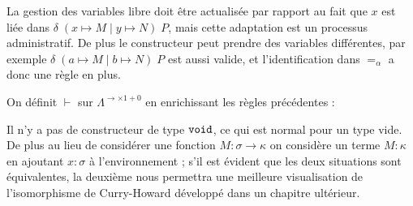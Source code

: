 \begin{rmk}
    La gestion des variables libre doit être actualisée par rapport au fait que $x$ est liée dans $\delta\;(x\mapsto M\mid y\mapsto N)\;P$, mais cette adaptation est un processus administratif. De plus le constructeur peut prendre des variables différentes, par exemple $\delta\;(a\mapsto M\mid b\mapsto N)\;P$ est aussi valide, et l'identification dans $=_\alpha$ a donc une règle en plus.
\end{rmk}

\begin{defi}
    On définit $\vdash$ sur $\Lambda^{\to\times 1+0}$ en enrichissant les règles précédentes :
    \begin{center}
        \begin{prooftree}
        \end{prooftree}
        \qquad
        \begin{prooftree}
        \end{prooftree}
        \qquad
        \begin{prooftree}
        \end{prooftree}

        \vspace{0.5cm}

        \begin{prooftree}
        \end{prooftree}
    \end{center}
\end{defi}

\begin{rmk}
    Il n'y a pas de constructeur de type $\voidt$, ce qui est normal pour un type vide. De plus au lieu de considérer une fonction $M : \sigma\to\kappa$ on considère un terme $M : \kappa$ en ajoutant $x : \sigma$ à l'environnement ; s'il est évident que les deux situations sont équivalentes, la deuxième nous permettra une meilleure visualisation de l'isomorphisme de Curry-Howard développé dans un chapitre ultérieur.
\end{rmk}

